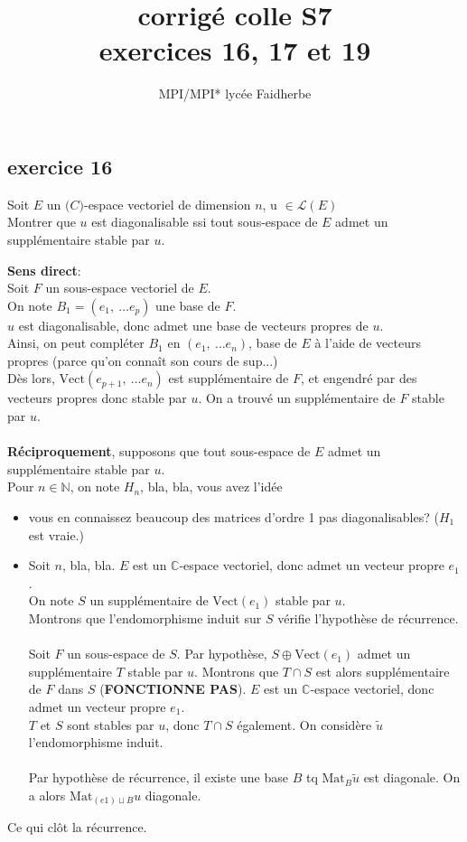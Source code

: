 \documentclass[a4paper,12pt]{article}
\title{ corrigé colle S7 \\
\large exercices 16, 17 et 19}
\author{MPI/MPI* lycée Faidherbe}
\date{}
\begin{document}
	
	\maketitle
	
	\subsection*{exercice 16}
	Soit $E$ un $\mathbb(C)$-espace vectoriel de dimension $n$, u $\in \mathcal L(E)$ \\
	Montrer que $u$ est diagonalisable ssi tout sous-espace de $E$ admet un supplémentaire stable par $u$.
	\begin{correctionbox}
		\textbf{Sens direct}: \\
		Soit $F$ un sous-espace vectoriel de $E$. \\
		On note $B_1=(e_1,\ \dots e_p)$ une base de $F$. \\
		$u$ est diagonalisable, donc admet une base de vecteurs propres de $u$. \\
		Ainsi, on peut compléter $B_1$ en $(e_1, \ \dots e_n)$, base de $E$ à l'aide de vecteurs propres (parce qu'on connaît son cours de sup...) \\ Dès lors, $\mathrm{Vect}(e_{p+1}, \ \dots e_n)$ est supplémentaire de $F$, et engendré par des vecteurs propres donc stable par $u$. On a trouvé un supplémentaire de $F$ stable par $u$.
		\\ \\
		\textbf{Réciproquement}, supposons que tout sous-espace de $E$ admet un supplémentaire stable par $u$. \\
		Pour $n \in \mathbb{N}$, on note $H_n$, bla, bla, vous avez l'idée
		\begin{itemize}
			\item vous en connaissez beaucoup des matrices d'ordre 1 pas diagonalisables? ($H_1$ est vraie.)
			\item Soit $n$, bla, bla.
			$E$ est un $\mathbb{C}$-espace vectoriel, donc admet un vecteur propre $e_1$. \\
			On note $S$ un supplémentaire de $\mathrm{Vect}(e_1)$ stable par $u$. \\  Montrons que l'endomorphisme induit sur $S$ vérifie l'hypothèse de récurrence. \\ \\
			Soit $F$ un sous-espace de $S$. Par hypothèse, $S \oplus \mathrm{Vect}(e_1)$ admet un supplémentaire $T$ stable par $u$. Montrons que $T \cap S$ est alors supplémentaire  de $F$ dans $S$ (\textbf{FONCTIONNE PAS}). $E$ est un $\mathbb{C}$-espace vectoriel, donc admet un vecteur propre $e_1$. \\
			$T$ et $S$ sont stables par $u$, donc $T \cap S$ également. On considère $\tilde u$ l'endomorphisme induit. \\ \\
			Par hypothèse de récurrence, il existe une base $B$ tq $\mathrm{Mat}_B \tilde u$ est diagonale. On a alors $\mathrm{Mat}_{(e1)\sqcup B}u$ diagonale.
		\end{itemize}
		Ce qui clôt la récurrence.
		
		
	\end{correctionbox}
	
\end{document}
